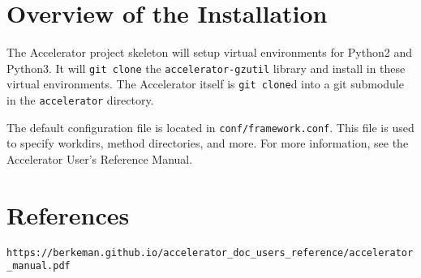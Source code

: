 \documentclass[a4paper]{article}
\begin{document}
\section{Overview of the Installation}
The Accelerator project skeleton will setup virtual environments for
Python2 and Python3.  It will \texttt{git clone} the
\texttt{accelerator-gzutil} library and install in these virtual
environments.  The Accelerator itself is \texttt{git clone}d into a
git submodule in the \texttt{accelerator} directory.

The default configuration file is located in
\texttt{conf/framework.conf}.  This file is used to specify workdirs,
method directories, and more.  For more information, see the
Accelerator User's Reference Manual.


\section*{References}

\texttt{https://berkeman.github.io/accelerator\_doc\_users\_reference/accelerator\_manual.pdf}
\end{document}
